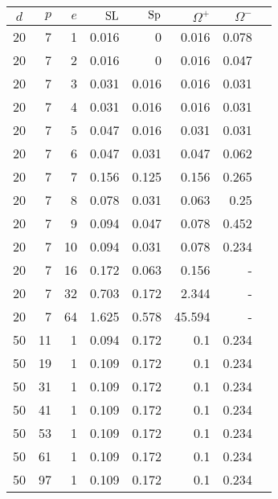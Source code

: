 \documentclass[12pt]{report}
\def\SL{{\rm SL}}
\def\Sp{{\rm Sp}}
\begin{document}
\begin{table}[htp]																						
\label{timings}																						
\begin{center}																						
\begin{tabular}																						
{|c|r|r|r|r|r|r|r|} \hline												
$d$	&	$p$ 	&	$e$ 	&	$\SL$ 	&	$\Sp$ 	&	$\Omega^+$	&	$\Omega^-$
\rule{0cm}{2.5ex}\\ \hline												
20	&	7	&	1	&	0.016	&	0	&	0.016	&	0.078	\rule{0cm}{2.5ex}\\ \hline
20	&	7	&	2	&	0.016	&	0	&	0.016	&	0.047	\rule{0cm}{2.5ex}\\ \hline
20	&	7	&	3	&	0.031	&	0.016	&	0.016	&	0.031	\rule{0cm}{2.5ex}\\ \hline
20	&	7	&	4	&	0.031	&	0.016	&	0.016	&	0.031	\rule{0cm}{2.5ex}\\ \hline
20	&	7	&	5	&	0.047	&	0.016	&	0.031	&	0.031	\rule{0cm}{2.5ex}\\ \hline
20	&	7	&	6	&	0.047	&	0.031	&	0.047	&	0.062	\rule{0cm}{2.5ex}\\ \hline
20	&	7	&	7	&	0.156	&	0.125	&	0.156	&	0.265	\rule{0cm}{2.5ex}\\ \hline
20	&	7	&	8	&	0.078	&	0.031	&	0.063	&	0.25	\rule{0cm}{2.5ex}\\ \hline
20	&	7	&	9	&	0.094	&	0.047	&	0.078	&	0.452	\rule{0cm}{2.5ex}\\ \hline
20	&	7	&	10	&	0.094	&	0.031	&	0.078	&	0.234	\rule{0cm}{2.5ex}\\ \hline
20	&	7	&	16	&	0.172	&	0.063	&	0.156	&	-	\rule{0cm}{2.5ex}\\ \hline
20	&	7	&	32	&	0.703	&	0.172	&	2.344	&	-	\rule{0cm}{2.5ex}\\ \hline
20	&	7	&	64	&	1.625	&	0.578	&	45.594	&	-	\rule{0cm}{2.5ex}\\ \hline
50	&	11	&	1	&	0.094	&	0.172	&	0.1	&	0.234	\rule{0cm}{2.5ex}\\ \hline
50	&	19	&	1	&	0.109	&	0.172	&	0.1	&	0.234	\rule{0cm}{2.5ex}\\ \hline
50	&	31	&	1	&	0.109	&	0.172	&	0.1	&	0.234	\rule{0cm}{2.5ex}\\ \hline
50	&	41	&	1	&	0.109	&	0.172	&	0.1	&	0.234	\rule{0cm}{2.5ex}\\ \hline
50	&	53	&	1	&	0.109	&	0.172	&	0.1	&	0.234	\rule{0cm}{2.5ex}\\ \hline
50	&	61	&	1	&	0.109	&	0.172	&	0.1	&	0.234	\rule{0cm}{2.5ex}\\ \hline
50	&	97	&	1	&	0.109	&	0.172	&	0.1	&	0.234	\rule{0cm}{2.5ex}\\ \hline

\end{tabular}
\end{center}
\end{table}
\end{document}
